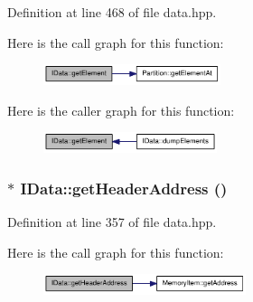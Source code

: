 Definition at line 468 of file data.hpp.

Here is the call graph for this function:\nopagebreak
\begin{figure}[H]
\begin{center}
\leavevmode
\includegraphics[width=147pt]{class_i_data_ae766e303b50d3af4cbfd8c3dad4672c1_cgraph}
\end{center}
\end{figure}


Here is the caller graph for this function:\nopagebreak
\begin{figure}[H]
\begin{center}
\leavevmode
\includegraphics[width=144pt]{class_i_data_ae766e303b50d3af4cbfd8c3dad4672c1_icgraph}
\end{center}
\end{figure}
\hypertarget{class_i_data_aa47c48488508421dfab3f8b2c226401e}{
\subsubsection[{getHeaderAddress}]{$\ast$ IData::getHeaderAddress ()}}
\label{class_i_data_aa47c48488508421dfab3f8b2c226401e}


Definition at line 357 of file data.hpp.

Here is the call graph for this function:\nopagebreak
\begin{figure}[H]
\begin{center}
\leavevmode
\includegraphics[width=168pt]{class_i_data_aa47c48488508421dfab3f8b2c226401e_cgraph}
\end{center}
\end{figure}


